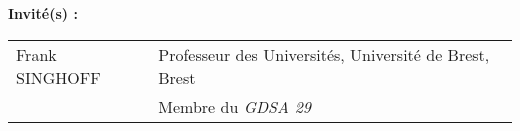{\vspace{\baselineskip}
{\normalsize \textbf{Invit\'{e}(s) :}}\\ \newline
\footnotesize
\begin{tabular}{@{}ll}
Frank SINGHOFF & Professeur des Universités, Université de Brest, Brest\\
 & Membre du \textit{GDSA 29}
\end{tabular}

}


\maketitle
